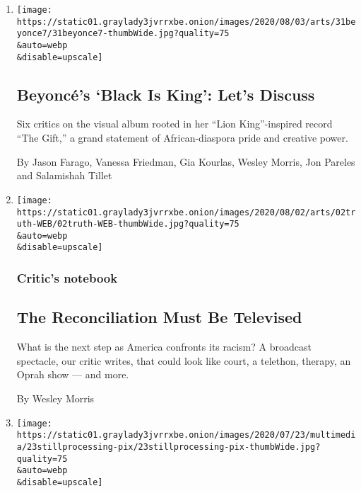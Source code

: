 \begin{enumerate}
\def\labelenumi{\arabic{enumi}.}
\item
  \href{/2020/07/31/arts/music/beyonce-black-is-king.html}{}

  \texttt{[image: https://static01.graylady3jvrrxbe.onion/images/2020/08/03/arts/31beyonce7/31beyonce7-thumbWide.jpg?quality=75\\\&auto=webp\\\&disable=upscale]}

  \hypertarget{beyoncuxe9s-black-is-king-lets-discuss}{%
  \subsection{Beyoncé's `Black Is King': Let's
  Discuss}\label{beyoncuxe9s-black-is-king-lets-discuss}}

  Six critics on the visual album rooted in her ``Lion King''-inspired
  record ``The Gift,'' a grand statement of African-diaspora pride and
  creative power.

  By Jason Farago, Vanessa Friedman, Gia Kourlas, Wesley Morris, Jon
  Pareles and Salamishah Tillet
\item
  \href{/2020/07/30/arts/television/the-moment-racism-tv.html}{}

  \texttt{[image: https://static01.graylady3jvrrxbe.onion/images/2020/08/02/arts/02truth-WEB/02truth-WEB-thumbWide.jpg?quality=75\\\&auto=webp\\\&disable=upscale]}

  \hypertarget{critics-notebook}{%
  \subsubsection{Critic's notebook}\label{critics-notebook}}

  \hypertarget{the-reconciliation-must-be-televised}{%
  \subsection{The Reconciliation Must Be
  Televised}\label{the-reconciliation-must-be-televised}}

  What is the next step as America confronts its racism? A broadcast
  spectacle, our critic writes, that could look like court, a telethon,
  therapy, an Oprah show --- and more.

  By Wesley Morris
\item
  \href{/2020/07/23/podcasts/hamilton-ziwe-discomfort.html}{}

  \texttt{[image: https://static01.graylady3jvrrxbe.onion/images/2020/07/23/multimedia/23stillprocessing-pix/23stillprocessing-pix-thumbWide.jpg?quality=75\\\&auto=webp\\\&disable=upscale]}


\end{enumerate}
